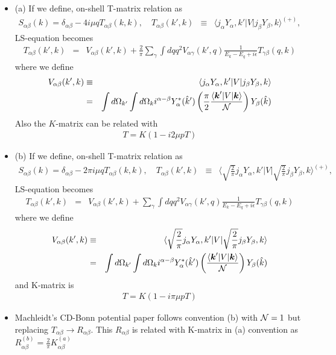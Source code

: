 \documentclass[10pt]{book}
\def\bm{\boldsymbol}
\newcommand{\bea}{\begin{eqnarray}}
\newcommand{\eea}{\end{eqnarray}}
\newcommand{\no}{\nonumber \\}
\def\vk{{\bm k}}
\def\la{\langle}
\def\ra{\rangle}
\begin{document}
\begin{itemize}
\item{(a)} If we define, on-shell T-matrix relation as
\bea 
S_{\alpha\beta}(k)=\delta_{\alpha\beta}-4i\mu q T_{\alpha\beta}(k,k),
\quad 
T_{\alpha\beta}(k',k) &\equiv& 
\la j_{\alpha} Y_{\alpha},k'|V| j_{\beta} Y_{\beta},k\ra^{(+)},
\eea 
LS-equation becomes
\bea 
T_{\alpha\beta}(k',k)&=&V_{\alpha\beta}(k',k) +\frac{2}{\pi}
\sum_{\gamma}\int dq q^2  V_{\alpha\gamma}(k',q)
  \frac{1}{E_k-E_q+i\epsilon}  
  T_{\gamma\beta}(q,k)
\eea 
where we define
\bea  
V_{\alpha\beta}(k',k) &\equiv& \la j_{\alpha} Y_{\alpha},k'|V| j_{\beta} Y_{\beta},k\ra
  \no 
  &=&  \int d\Omega_{k'}\int d\Omega_k  i^{\alpha-\beta} 
      Y^*_{\alpha}(\hat{k}')\left(\frac{\pi}{2}\frac{\la \vk'|V|\vk\ra}{\cal N}\right) 
      Y_{\beta}(\hat{k})
\eea 
Also the $K$-matrix can be related with
\bea 
T=K(1-i2\mu p T)
\eea 
\item{(b)} If we define, on-shell T-matrix relation as
\bea 
S_{\alpha\beta}(k)=\delta_{\alpha\beta}-2\pi i\mu q T_{\alpha\beta}(k,k),
\quad 
T_{\alpha\beta}(k',k) &\equiv& 
\la \sqrt{\frac{2}{\pi}}j_{\alpha} Y_{\alpha},k'|
  V|\sqrt{\frac{2}{\pi}} j_{\beta} Y_{\beta},k\ra^{(+)},
\eea 
LS-equation becomes
\bea 
T_{\alpha\beta}(k',k)&=&V_{\alpha\beta}(k',k) 
 +\sum_{\gamma}\int dq q^2  V_{\alpha\gamma}(k',q)
  \frac{1}{E_k-E_q+i\epsilon}  
  T_{\gamma\beta}(q,k)
\eea 
where we define
\bea  
V_{\alpha\beta}(k',k) &\equiv& \la\sqrt{\frac{2}{\pi}} j_{\alpha} Y_{\alpha},k'|V| \sqrt{\frac{2}{\pi}} j_{\beta} Y_{\beta},k\ra
  \no 
  &=&  \int d\Omega_{k'}\int d\Omega_k  i^{\alpha-\beta} 
      Y^*_{\alpha}(\hat{k}')\left(\frac{\la \vk'|V|\vk\ra}{\cal N}\right) 
      Y_{\beta}(\hat{k})
\eea 
and K-matrix is
\bea 
T=K(1-i\pi\mu p T)
\eea 
\item Machleidt's CD-Bonn potential paper follows convention (b) with ${\cal N}=1$
      but replacing 
      $T_{\alpha\beta}\to R_{\alpha\beta}$. This $R_{\alpha\beta}$ is related with 
      K-matrix in (a) convention as
       $R_{\alpha\beta}^{(b)}=\frac{2}{\pi}K_{\alpha\beta}^{(a)}$
      

\end{itemize}
\end{document}
